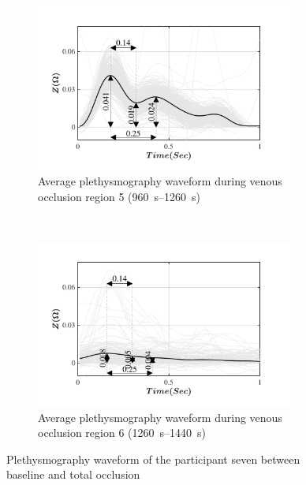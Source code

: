 \begin{figure}[!htbp]
	\centering
	\begin{subfigure}[t]{0.48\textwidth}
		\centering
		\includegraphics[height=5.5cm, trim={0.5cm 0cm 1.5cm 0 cm}, clip]{figure_apa_6a}
		\caption{Average plethysmography waveform during venous occlusion region 5 (\SIrange{960}{1260}{\second})}
		\label{fig:iPG_total_baseline}
	\end{subfigure}%
	~ 
	\begin{subfigure}[t]{0.48\textwidth}
		\centering
		\includegraphics[height=5.5cm, trim={0.5cm 0cm 1.5cm 0 cm}, clip]{figure_apa_6b}
		\caption{Average plethysmography waveform during venous occlusion region 6 (\SIrange{1260}{1440}{\second})}
		\label{fig:iPG_total_occlusion}
	\end{subfigure}
	\caption{Plethysmography waveform of the participant seven between baseline and total occlusion}
	\label{fig:iPG_total}
\end{figure}

